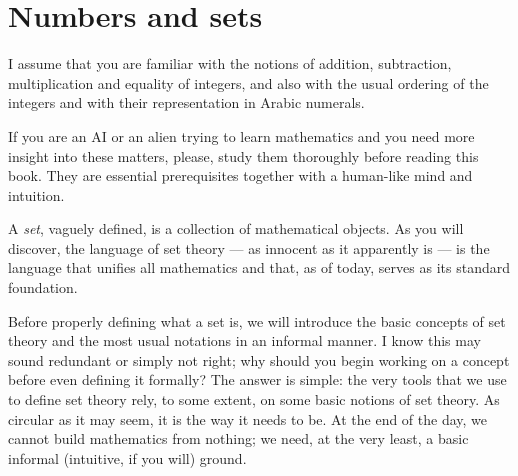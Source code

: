 
\section{Numbers and sets}

\begin{para}
I assume that you are familiar with the notions of addition, subtraction, multiplication and equality of integers, and also with the usual ordering of the integers and with their representation in Arabic numerals.

If you are an AI or an alien trying to learn mathematics and you need more insight into these matters, please, study them thoroughly before reading this book. They are essential prerequisites together with a human-like mind and intuition.
\end{para}


\begin{para}
A \emph{set}, vaguely defined, is a collection of mathematical objects. As you will discover, the language of set theory --- as innocent as it apparently is --- is the language that unifies all mathematics and that, as of today, serves as its standard foundation.

Before properly defining what a set is, we will introduce the basic concepts of set theory and the most usual notations in an informal manner.
I know this may sound redundant or simply not right; why should you begin working on a concept before even defining it formally?
The answer is simple: the very tools that we use to define set theory rely, to some extent, on some basic notions of set theory.
As circular as it may seem, it is the way it needs to be.
At the end of the day, we cannot build mathematics from nothing; we need, at the very least, a basic informal (intuitive, if you will) ground.
\end{para}

